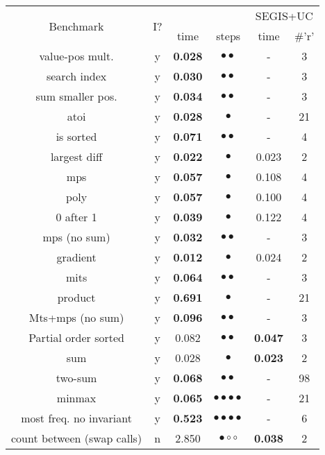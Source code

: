 	{\small
		\begin{longtable}[h]{|c|c|c|c||c|c|}
			\hline
			\multirow{2}{*}{Benchmark} &                 \multirow{2}{*}{I?} &                 \multicolumn{2}{c||}{\setwogis} &                 \multicolumn{2}{c|}{SEGIS+UC}\\ 
			\cline{3-6}
			 & & time & steps & time & \#'r' \\ 
			\hline
value-pos mult. & y & {\bf 0.028} & $\bullet\bullet$ & -  & 3 \\ 
search index & y & {\bf 0.030} & $\bullet\bullet$ & -  & 3 \\ 
sum smaller pos. & y & {\bf 0.034} & $\bullet\bullet$ & -  & 3 \\ 
			\hline
atoi & y & {\bf 0.028} & $\bullet$ & -  & 21 \\ 
is sorted & y & {\bf 0.071} & $\bullet\bullet$ & -  & 4 \\ 
largest diff & y & {\bf 0.022} & $\bullet$ &  0.023  & 2 \\ 
mps & y & {\bf 0.057} & $\bullet$ &  0.108  & 4 \\ 
poly & y & {\bf 0.057} & $\bullet$ &  0.100  & 4 \\ 
0 after 1 & y & {\bf 0.039} & $\bullet$ &  0.122  & 4 \\ 
			\hline
mps (no sum) & y & {\bf 0.032} & $\bullet\bullet$ & -  & 3 \\ 
			\hline
gradient & y & {\bf 0.012} & $\bullet$ &  0.024  & 2 \\ 
mits & y & {\bf 0.064} & $\bullet\bullet$ & -  & 3 \\ 
			\hline
product & y & {\bf 0.691} & $\bullet$ & -  & 21 \\ 
			\hline
Mts+mps (no sum) & y & {\bf 0.096} & $\bullet\bullet$ & -  & 3 \\ 
			\hline
Partial order sorted & y &  0.082 & $\bullet\bullet$ & {\bf 0.047}  & 3 \\ 
sum  & y &  0.028 & $\bullet$ & {\bf 0.023}  & 2 \\ 
two-sum & y & {\bf 0.068} & $\bullet\bullet$ & -  & 98 \\ 
minmax & y & {\bf 0.065} & $\bullet\bullet\bullet\bullet$ & -  & 21 \\ 
most freq. no invariant & y & {\bf 0.523} & $\bullet\bullet\bullet\bullet$ & -  & 6 \\ 
count between (swap calls) & n &  2.850 & $\bullet\circ\circ$ & {\bf 0.038}  & 2 \\ 

\end{longtable}}
